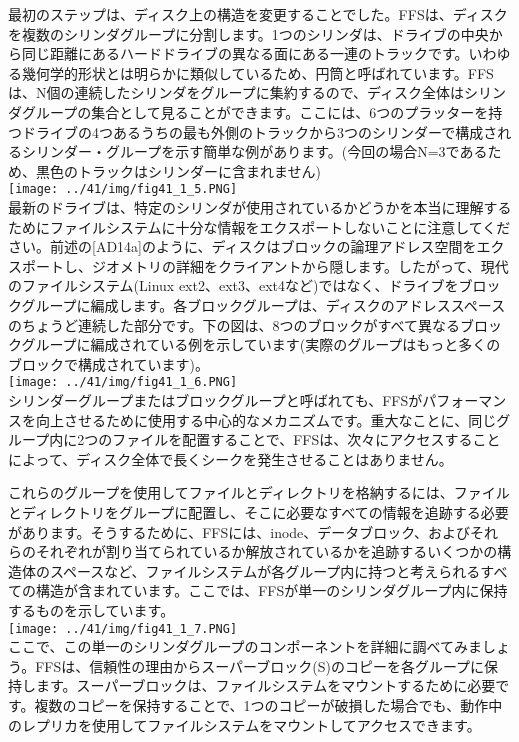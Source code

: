 最初のステップは、ディスク上の構造を変更することでした。FFSは、ディスクを複数のシリンダグループに分割します。1つのシリンダは、ドライブの中央から同じ距離にあるハードドライブの異なる面にある一連のトラックです。いわゆる幾何学的形状とは明らかに類似しているため、円筒と呼ばれています。FFSは、N個の連続したシリンダをグループに集約するので、ディスク全体はシリンダグループの集合として見ることができます。ここには、6つのプラッターを持つドライブの4つあるうちの最も外側のトラックから3つのシリンダーで構成されるシリンダー・グループを示す簡単な例があります。(今回の場合N=3であるため、黒色のトラックはシリンダーに含まれません)\\
\texttt{[image: ../41/img/fig41\_1\_5.PNG]}\\
最新のドライブは、特定のシリンダが使用されているかどうかを本当に理解するためにファイルシステムに十分な情報をエクスポートしないことに注意してください。前述の{[}AD14a{]}のように、ディスクはブロックの論理アドレス空間をエクスポートし、ジオメトリの詳細をクライアントから隠します。したがって、現代のファイルシステム(Linux
ext2、ext3、ext4など)ではなく、ドライブをブロックグループに編成します。各ブロックグループは、ディスクのアドレススペースのちょうど連続した部分です。下の図は、8つのブロックがすべて異なるブロックグループに編成されている例を示しています(実際のグループはもっと多くのブロックで構成されています)。\\
\texttt{[image: ../41/img/fig41\_1\_6.PNG]}\\
シリンダーグループまたはブロックグループと呼ばれても、FFSがパフォーマンスを向上させるために使用する中心的なメカニズムです。重大なことに、同じグループ内に2つのファイルを配置することで、FFSは、次々にアクセスすることによって、ディスク全体で長くシークを発生させることはありません。

これらのグループを使用してファイルとディレクトリを格納するには、ファイルとディレクトリをグループに配置し、そこに必要なすべての情報を追跡する必要があります。そうするために、FFSには、inode、データブロック、およびそれらのそれぞれが割り当てられているか解放されているかを追跡するいくつかの構造体のスペースなど、ファイルシステムが各グループ内に持つと考えられるすべての構造が含まれています。ここでは、FFSが単一のシリンダグループ内に保持するものを示しています。\\
\texttt{[image: ../41/img/fig41\_1\_7.PNG]}\\
ここで、この単一のシリンダグループのコンポーネントを詳細に調べてみましょう。FFSは、信頼性の理由からスーパーブロック(S)のコピーを各グループに保持します。スーパーブロックは、ファイルシステムをマウントするために必要です。複数のコピーを保持することで、1つのコピーが破損した場合でも、動作中のレプリカを使用してファイルシステムをマウントしてアクセスできます。

